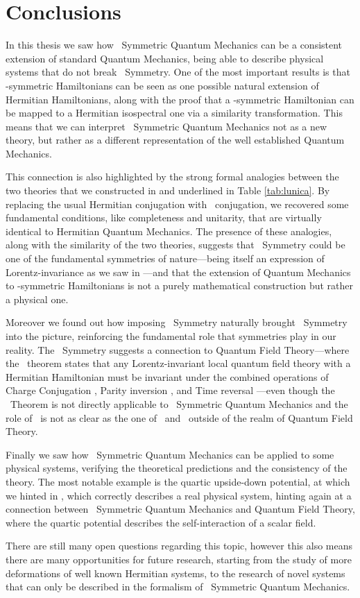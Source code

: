 \chapter{Conclusions}\label{ch:conclusions}
    In this thesis we saw how \PT\ Symmetric Quantum Mechanics can be a consistent extension of standard Quantum Mechanics, being able to describe physical systems that do not break \PT\ Symmetry. One of the most important results is that \PT-symmetric Hamiltonians can be seen as one possible natural extension of Hermitian Hamiltonians, along with the proof that a \PT-symmetric Hamiltonian can be mapped to a Hermitian isospectral one via a similarity transformation. This means that we can interpret \PT\ Symmetric Quantum Mechanics not as a new theory, but rather as a different representation of the well established Quantum Mechanics.
    
    This connection is also highlighted by the strong formal analogies between the two theories that we constructed in  and underlined in Table \ref{tab:lunica}. By replacing the usual Hermitian conjugation with \CPT\ conjugation, we recovered some fundamental conditions, like completeness and unitarity, that are virtually identical to Hermitian Quantum Mechanics. The presence of these analogies, along with the similarity of the two theories, suggests that \PT\ Symmetry could be one of the fundamental symmetries of nature---being itself an expression of Lorentz-invariance as we saw in ---and that the extension of Quantum Mechanics to \PT-symmetric Hamiltonians is not a purely mathematical construction but rather a physical one.

    Moreover we found out how imposing \PT\ Symmetry naturally brought \CPT\ Symmetry into the picture, reinforcing the fundamental role that symmetries play in our reality. The \CPT\ Symmetry suggests a connection to Quantum Field Theory---where the \CPT\ theorem states that any Lorentz-invariant local quantum field theory with a Hermitian Hamiltonian must be invariant under the combined operations of Charge Conjugation \hC, Parity inversion \hP, and Time reversal \hT---even though the \CPT\ Theorem is not directly applicable to \PT\ Symmetric Quantum Mechanics and the role of \hC\ is not as clear as the one of \hP\ and \hT\ outside of the realm of Quantum Field Theory.

    Finally we saw how \PT\ Symmetric Quantum Mechanics can be applied to some physical systems, verifying the theoretical predictions and the consistency of the theory. The most notable example is the quartic upside-down potential, at which we hinted in , which correctly describes a real physical system, hinting again at a connection between \PT\ Symmetric Quantum Mechanics and Quantum Field Theory, where the quartic potential describes the self-interaction of a scalar field.

    There are still many open questions regarding this topic, however this also means there are many opportunities for future research, starting from the study of more deformations of well known Hermitian systems, to the research of novel systems that can only be described in the formalism of \PT\ Symmetric Quantum Mechanics.